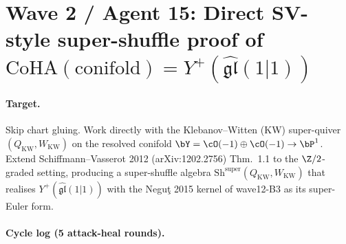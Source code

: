 
\providecommand{\ClaimStatusTheorem}{\textbf{[theorem]}}
\providecommand{\ClaimStatusVerified}{\textbf{[verified]}}
\providecommand{\ClaimStatusDerivation}{\textbf{[derivation]}}
\providecommand{\ClaimStatusConjectural}{\textbf{[conjectural]}}
\providecommand{\ClaimStatusOpen}{\textbf{[open]}}
\providecommand{\ClaimStatusFalsified}{\textbf{[falsified]}}
\providecommand{\CoHA}{\mathrm{CoHA}}
\providecommand{\Sh}{\mathrm{Sh}}
\providecommand{\Sym}{\mathrm{Sym}}
\providecommand{\Jac}{\mathrm{Jac}}
\providecommand{\osp}{\mathfrak{osp}}
\providecommand{\fgl}{\mathfrak{gl}}
\providecommand{\fsl}{\mathfrak{sl}}
\providecommand{\kappach}{\kappa_{\mathrm{ch}}}
\providecommand{\kappacat}{\kappa_{\mathrm{cat}}}

\section*{Wave 2 / Agent 15: Direct SV-style super-shuffle proof of
\texorpdfstring{$\CoHA(\mathrm{conifold}) = Y^+(\widehat{\fgl}(1|1))$}{CoHA(conifold)=Y+(gl(1|1)-hat)}}
\label{sec:wave2-agent15-sv-conifold-super}

\paragraph{Target.} Skip chart gluing. Work directly with the Klebanov--Witten
(KW) super-quiver $(Q_{\mathrm{KW}}, W_{\mathrm{KW}})$ on the resolved
conifold $\bY = \cO(-1)\oplus\cO(-1)\to\bP^1$. Extend Schiffmann--Vasserot
2012 (arXiv:1202.2756) Thm.~1.1 to the $\Z/2$-graded setting, producing a
super-shuffle algebra $\Sh^{\mathrm{super}}(Q_{\mathrm{KW}}, W_{\mathrm{KW}})$
that realises $Y^+(\widehat{\fgl}(1|1))$ with the Negu\c{t} 2015 kernel of
wave12-B3 as its super-Euler form.

\paragraph{Cycle log (5 attack-heal rounds).}

